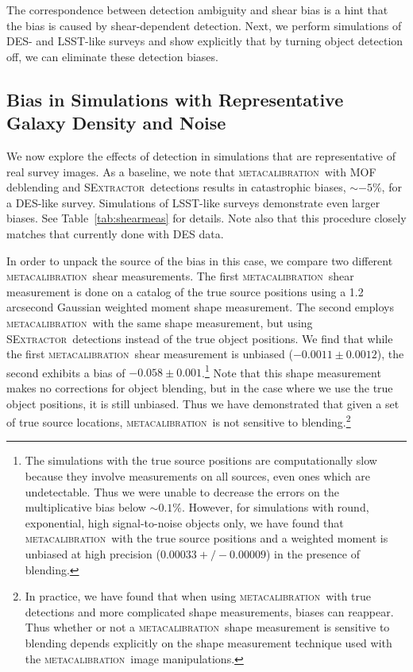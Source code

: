 \documentclass[fleqn,useAMS,usenatbib]{mnras}
\newcommand{\mcal}{\textsc{metacalibration}}
\newcommand{\sx}{\textsc{SExtractor}}
\begin{document}
The correspondence between detection ambiguity and shear bias is a hint that
the bias is caused by shear-dependent detection. Next, we perform simulations
of DES- and LSST-like surveys and show explicitly that by turning object
detection off, we can eliminate these detection biases.

\subsection{Bias in Simulations with Representative Galaxy Density and Noise}

We now explore the effects of detection in simulations that are representative
of real survey images. As a baseline, we note that \mcal\ with MOF
deblending and \sx\ detections results in catastrophic biases, $\sim-5\%$, for
a DES-like survey. Simulations of LSST-like surveys demonstrate even larger
biases. See Table~\ref{tab:shearmeas} for details. Note also that this
procedure closely matches that currently done with DES data.

In order to unpack the source of the bias in this case, we compare two different
\mcal\ shear measurements. The first \mcal\ shear measurement is done on a
catalog of the true source positions using a 1.2 arcsecond Gaussian weighted
moment shape measurement. The second employs \mcal\ with the same shape
measurement, but using \sx\ detections instead of the true object positions. We
find that while the first \mcal\ shear measurement is unbiased
($-0.0011\pm0.0012$), the second exhibits a bias of
$-0.058\pm0.001$.\footnote{The simulations with the true source positions are
computationally slow because they involve measurements on all sources, even ones
which are undetectable. Thus we were unable to decrease the errors on the
multiplicative bias below $\sim0.1\%$. However, for simulations with round,
exponential, high signal-to-noise objects only, we have found that \mcal\ with
the true source positions and a weighted moment is unbiased at high precision
($0.00033 +/- 0.00009$) in the presence of blending.} Note that this shape
measurement makes no corrections for object blending, but in the case where we
use the true object positions, it is still unbiased. Thus we have demonstrated
that given a set of true source locations, \mcal\ is not sensitive to
blending.\footnote{In practice, we have found that when using \mcal\ with true
detections and more complicated shape measurements, biases can reappear. Thus
whether or not a \mcal\ shape measurement is sensitive to blending depends
explicitly on the shape measurement technique used with the \mcal\ image
manipulations.}
\end{document}
